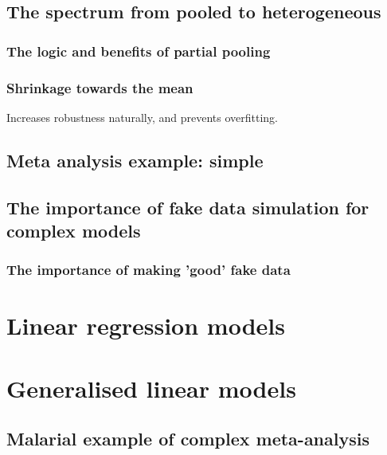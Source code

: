 \documentclass[11pt,fullpage]{book}
\begin{document}
\section{The spectrum from pooled to heterogeneous}
\subsection{The logic and benefits of partial pooling}
\subsection{Shrinkage towards the mean}
Increases robustness naturally, and prevents overfitting.

\section{Meta analysis example: simple}

\section{The importance of fake data simulation for complex models}
\subsection{The importance of making 'good' fake data}

\chapter{Linear regression models}
\chapter{Generalised linear models}
\section{Malarial example of complex meta-analysis}




\end{document}
